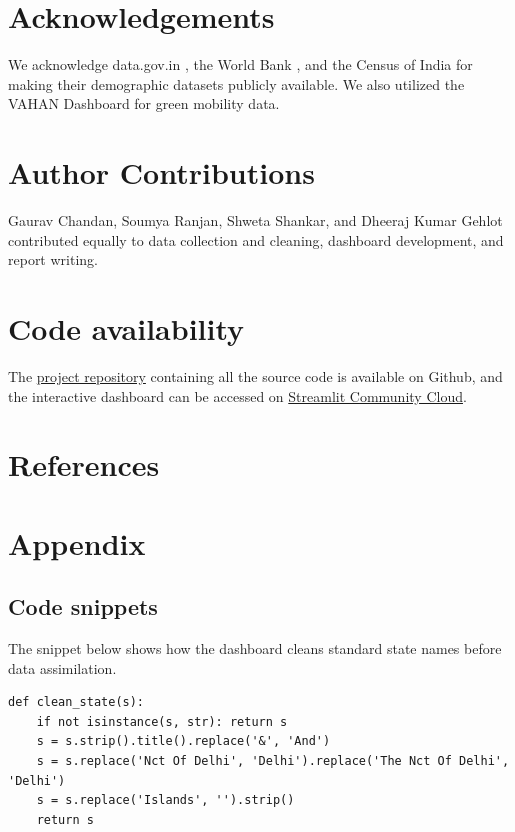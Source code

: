 \documentclass[abstract=true]{scrartcl}
\begin{document}
\section{Acknowledgements}
We acknowledge data.gov.in \cite{datagov}, the World Bank \cite{worldbank}, and the Census of India \cite{census2011} for making their demographic datasets publicly available. We also utilized the VAHAN Dashboard \cite{vahan} for green mobility data.

\section{Author Contributions}
Gaurav Chandan, Soumya Ranjan, Shweta Shankar, and Dheeraj Kumar Gehlot contributed equally to data collection and cleaning, dashboard development, and report writing.

\section{Code availability}
The \href{https://github.com/gauravchandan/DS-Practice-2026-Team-3}{project repository} containing all the source code is available on Github, and the interactive dashboard can be accessed on \href{https://indiametrics.streamlit.app}{Streamlit Community Cloud}.

\section{References}



\section{Appendix}



\subsection{Code snippets}

The snippet below shows how the dashboard cleans standard state names before data assimilation.

\begin{verbatim}
def clean_state(s):
    if not isinstance(s, str): return s
    s = s.strip().title().replace('&', 'And')
    s = s.replace('Nct Of Delhi', 'Delhi').replace('The Nct Of Delhi', 'Delhi')
    s = s.replace('Islands', '').strip()
    return s
\end{verbatim}
\end{document}
